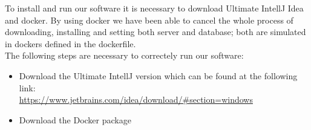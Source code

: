 To install and run our software it is necessary to download Ultimate IntellJ Idea and docker. By using docker we have been able to cancel the whole process of downloading, installing and setting both server and database; both are simulated in dockers defined in the dockerfile.\\
The following steps are necessary to correctely run our software:
\begin{itemize}
	\item Download the Ultimate IntellJ version which can be found at the following link:\\
 		\url{https://www.jetbrains.com/idea/download/#section=windows}
	\item Download the Docker package

\end{itemize}
